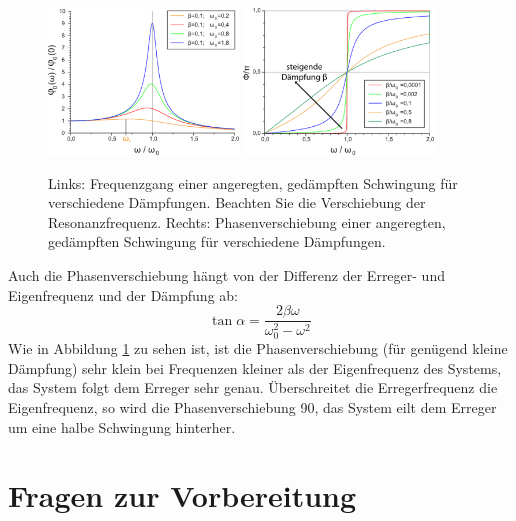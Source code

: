 \begin{figure}[ht!]
	\centering
	\includegraphics[width=0.45\textwidth]{Versuch_neu_1-2/figures/3946.pdf}
	\includegraphics[width=0.45\textwidth]{Versuch_neu_1-2/figures/3947.pdf}
	\caption{Links: Frequenzgang einer angeregten, gedämpften Schwingung für verschiedene Dämpfungen. Beachten Sie die Verschiebung der Resonanzfrequenz. Rechts: Phasenverschiebung einer angeregten, gedämpften Schwingung für verschiedene Dämpfungen.}
	\label{fig:Resonanz}
\end{figure}

Auch die Phasenverschiebung hängt von der Differenz der Erreger- und Eigenfrequenz und der Dämpfung ab:
\begin{equation*}
	\tan\alpha = \frac{2\beta\omega}{\omega_0^2-\omega^2}
\end{equation*}
Wie in Abbildung \ref{fig:Resonanz} zu sehen ist, ist die Phasenverschiebung (für genügend kleine Dämpfung) sehr klein bei Frequenzen kleiner als der Eigenfrequenz des Systems, das System folgt dem Erreger sehr genau. Überschreitet die Erregerfrequenz die Eigenfrequenz, so wird die Phasenverschiebung 90\degree, das System eilt dem Erreger um eine halbe Schwingung hinterher.
\section{Fragen zur Vorbereitung}

